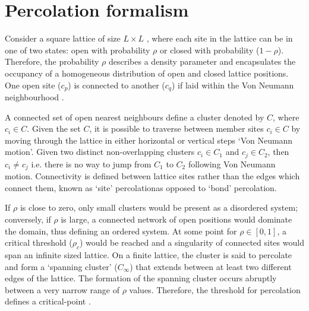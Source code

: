 \section{Percolation formalism}
\label{sec:perc-form}
Consider a square lattice of size $L \times L$ , where each site in the lattice can be in one of two states: %
open with probability $\rho$ or closed with probability ($1-\rho$). %
Therefore, the probability $\rho$ describes a density parameter and encapsulates the occupancy of a homogeneous distribution of open and closed lattice positions.
One open site ($c_p$) is connected to another ($c_q$) if laid within the Von Neumann neighbourhood \cite{toffoli1987cellular}.

A connected set of open nearest neighbours define a cluster denoted by $C$, where $c_i \in C$.
Given the set $C$, it is possible to traverse between member sites $c_i \in C$ by moving through the lattice in either horizontal or vertical steps `Von Neumann motion'. 
Given two distinct non-overlapping clusters $c_i \in C_1$ and $c_j \in C_2$, then $c_i \neq c_j $ i.e. there is no way to jump from $C_1$ to $C_2$ following Von Neumann motion. 
Connectivity is defined between lattice sites rather than the edges which connect them, known as `site' percolation\textemdash as opposed to `bond' percolation.

If $\rho$ is close to zero, only small clusters would be present as a disordered system; 
conversely, if $\rho$ is large, a connected network of open positions would dominate the domain, thus defining an ordered system.
At some point for $\rho \in [0, 1]$, a critical threshold ($\rho_c$) would be reached and a singularity of connected sites would span an infinite sized lattice.
On a finite lattice, the cluster is said to percolate and form a `spanning cluster' ($C_\infty$) that extends between at least two different edges of the lattice.
The formation of the spanning cluster occurs abruptly between a very narrow range of $\rho$ values. 
Therefore, the threshold for percolation defines a critical-point \cite{STAUFFER19791}. 


